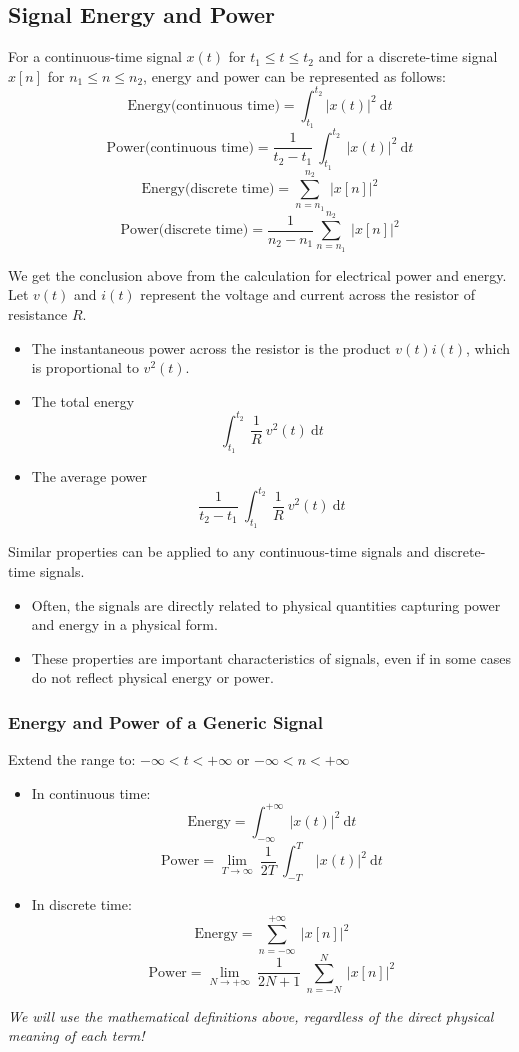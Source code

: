 \subsection{Signal Energy and Power}
For a continuous-time signal $x(t)$ for $t_1 \leq t \leq t_2$ and for a discrete-time signal $x[n]$ for $n_1 \leq n \leq n_2$, energy and power can be represented as follows:
\[ \text{Energy(continuous time)} = \int_{t_1}^{t_2} \lvert x(t) \rvert^2 \ \mathrm{d}t \]
\[ \text{Power(continuous  time)} = \frac{1}{t_2 - t_1} \ \int_{t_1}^{t_2} \ \lvert x(t) \rvert^2 \ \mathrm{d}t \]
\[ \text{Energy(discrete time)} = \sum_{n=n_1}^{n_2} \ \lvert x[n] \rvert ^2 \]
\[ \text{Power(discrete time)} = \frac{1}{n_2 - n_1} \sum_{n=n_1}^{n_2} \ \lvert x[n] \rvert ^2 \]

\begin{tcolorbox}[title= Electrical circuit analogy, breakable]
We get the conclusion above from the calculation for electrical power and energy.
Let $v(t)$ and $i(t)$ represent the voltage and current across the resistor of resistance $R$. 
\begin{itemize}
    \item The instantaneous power across the resistor is the product $v(t)i(t)$, which is proportional to $v^2(t)$.
    \item The total energy \[ \int_{t_1}^{t_2} \ \frac{1}{R} \ v^2(t) \ \mathrm{d}t \] 
    \item The average power \[ \frac{1}{t_2 - t_1} \ \int_{t_1}^{t_2} \ \frac{1}{R} \ v^2(t) \ \mathrm{d}t \]
    \end{itemize}
    Similar properties can be applied to any continuous-time signals and discrete-time signals.
\end{tcolorbox}
  
\begin{itemize}
    \item Often, the signals are directly related to physical quantities capturing power and energy in a physical form.
    \item These properties are important characteristics of signals, even if in some cases do not reflect physical energy or power.
\end{itemize}

\subsubsection{Energy and Power of a Generic Signal}
Extend the range to: $-\infty<t<+\infty$ or $-\infty<n<+\infty$ 
\begin{itemize}
    \item In continuous time:
    \[ \text{Energy}= \int_{-\infty}^{+\infty} \ \lvert x(t) \rvert^2 \ \mathrm{d}t \]
    \[ \text{Power}= \lim_{T \to \infty} \ \frac{1}{2T} \ \int_{-T}^{T} \ \lvert x(t) \rvert^2 \ \mathrm{d}t \]
    \item In discrete time:
    \[ \text{Energy}= \sum_{n=-\infty}^{+\infty} \ \lvert x[n] \rvert^2 \]
    \[ \text{Power}=\lim_{N \to +\infty} \ \frac{1}{2N+1} \ \sum_{n=-N}^{N} \ \lvert x[n] \rvert^2 \]
\end{itemize}
\textit{We will use the mathematical definitions above, regardless of the direct physical meaning of each term!}